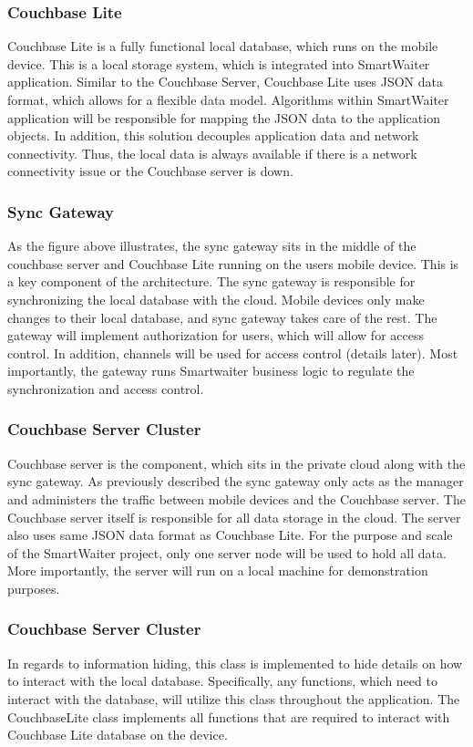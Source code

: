 \documentclass[12pt, titlepage]{article}
\begin{document}
\subsubsection{Couchbase Lite}
Couchbase Lite is a fully functional local database, which runs on the mobile device. This is a local storage system, which is integrated into SmartWaiter application.  Similar to the Couchbase Server, Couchbase Lite uses JSON data format, which allows for a flexible data model. Algorithms within SmartWaiter application will be responsible for mapping the JSON data to the application objects. In addition, this solution decouples application data and network connectivity. Thus, the local data is always available if there is a network connectivity issue or the Couchbase server is down. 

\subsubsection{Sync Gateway}
As the figure above illustrates, the sync gateway sits in the middle of the couchbase server and Couchbase Lite running on the users mobile device. This is a key component of the architecture. The sync gateway is responsible for synchronizing the local database with the cloud. Mobile devices only make changes to their local database, and sync gateway takes care of the rest.  The gateway will implement authorization for users, which will allow for access control. In addition, channels will be used for access control (details later). Most importantly, the gateway runs Smartwaiter business logic to regulate the synchronization and access control.

\subsubsection{Couchbase Server Cluster}
Couchbase server is the component, which sits in the private cloud along with the sync gateway. As previously described the sync gateway only acts as the manager and administers the traffic between mobile devices and the Couchbase server. The Couchbase server itself is responsible for all data storage in the cloud. The server also uses same JSON data format as Couchbase Lite. For the purpose and scale of the SmartWaiter project, only one server node will be used to hold all data. More importantly, the server will run on a local machine for demonstration purposes. 

\subsubsection{Couchbase Server Cluster}
In regards to information hiding, this class is implemented to hide details on how to interact with the local database. Specifically, any functions, which need to interact with the database, will utilize this class throughout the application. The CouchbaseLite class implements all functions that are required to interact with Couchbase Lite database on the device. 
\end{document}
